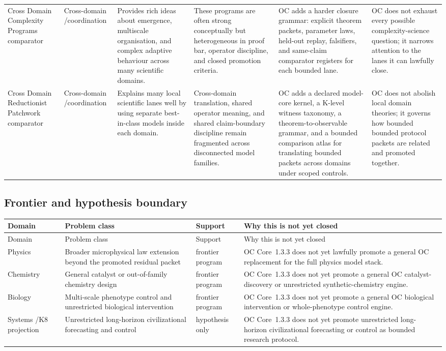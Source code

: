 \begin{longtable}{@{}L{0.17\textwidth}L{0.09\textwidth}L{0.17\textwidth}L{0.17\textwidth}L{0.20\textwidth}L{0.14\textwidth}@{}}
Cross Domain Complexity Programs comparator & Cross-domain /\allowbreak coordination & Provides rich ideas about emergence, multiscale organisation, and complex adaptive behaviour across many scientific domains. & These programs are often strong conceptually but heterogeneous in proof bar, operator discipline, and closed promotion criteria. & OC adds a harder closure grammar: explicit theorem packets, parameter laws, held-out replay, falsifiers, and same-claim comparator registers for each bounded lane. & OC does not exhaust every possible complexity-science question; it narrows attention to the lanes it can lawfully close. \\
Cross Domain Reductionist Patchwork comparator & Cross-domain /\allowbreak coordination & Explains many local scientific lanes well by using separate best-in-class models inside each domain. & Cross-domain translation, shared operator meaning, and shared claim-boundary discipline remain fragmented across disconnected model families. & OC adds a declared model-core kernel, a K-level witness taxonomy, a theorem-to-observable grammar, and a bounded comparison atlas for translating bounded packets across domains under scoped controls. & OC does not abolish local domain theories; it governs how bounded bounded protocol packets are related and promoted together. \\
\bottomrule
\end{longtable}

\subsection{Frontier and hypothesis boundary}
\begin{longtable}{@{}L{0.11\textwidth}L{0.19\textwidth}L{0.14\textwidth}L{0.48\textwidth}@{}}
\toprule
Domain & Problem class & Support & Why this is not yet closed \\
\midrule
\endfirsthead
\toprule
Domain & Problem class & Support & Why this is not yet closed \\
\midrule
\endhead
Physics & Broader microphysical law extension beyond the promoted residual packet & frontier program & OC Core~1.3.3 does not yet lawfully promote a general OC replacement for the full physics model stack. \\
Chemistry & General catalyst or out-of-family chemistry design & frontier program & OC Core~1.3.3 does not yet promote a general OC catalyst-discovery or unrestricted synthetic-chemistry engine. \\
Biology & Multi-scale phenotype control and unrestricted biological intervention & frontier program & OC Core~1.3.3 does not yet promote a general OC biological intervention or whole-phenotype control engine. \\
Systems /\allowbreak K8 projection & Unrestricted long-horizon civilizational forecasting and control & hypothesis only & OC Core~1.3.3 does not yet promote unrestricted long-horizon civilizational forecasting or control as bounded research protocol. \\
\bottomrule
\end{longtable}
\endgroup
